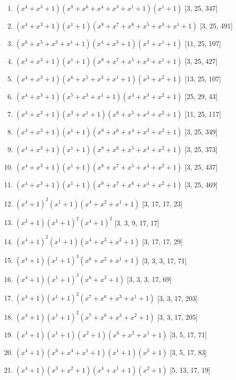\documentclass[10pt,twocolumn]{article}
\begin{document}
\begin{enumerate}
\item $(x^{4} + x^{3} + 1)(x^{8} + x^{6} + x^{4} + x^{3} + x^{1} + 1)(x^{1} + 1)$  [3, 25, 347]
\item $(x^{4} + x^{3} + 1)(x^{1} + 1)(x^{8} + x^{7} + x^{6} + x^{5} + x^{3} + x^{1} + 1)$  [3, 25, 491]
\item $(x^{6} + x^{5} + x^{3} + x^{1} + 1)(x^{4} + x^{3} + 1)(x^{3} + x^{1} + 1)$  [11, 25, 107]
\item $(x^{4} + x^{3} + 1)(x^{1} + 1)(x^{8} + x^{7} + x^{5} + x^{3} + x^{1} + 1)$  [3, 25, 427]
\item $(x^{4} + x^{3} + 1)(x^{6} + x^{5} + x^{3} + x^{1} + 1)(x^{3} + x^{2} + 1)$  [13, 25, 107]
\item $(x^{4} + x^{3} + 1)(x^{5} + x^{3} + x^{1} + 1)(x^{4} + x^{3} + x^{2} + 1)$  [25, 29, 43]
\item $(x^{4} + x^{3} + 1)(x^{3} + x^{1} + 1)(x^{6} + x^{5} + x^{4} + x^{2} + 1)$  [11, 25, 117]
\item $(x^{4} + x^{3} + 1)(x^{1} + 1)(x^{8} + x^{6} + x^{4} + x^{3} + x^{2} + 1)$  [3, 25, 349]
\item $(x^{4} + x^{3} + 1)(x^{1} + 1)(x^{8} + x^{6} + x^{5} + x^{4} + x^{2} + 1)$  [3, 25, 373]
\item $(x^{4} + x^{3} + 1)(x^{1} + 1)(x^{8} + x^{7} + x^{5} + x^{4} + x^{2} + 1)$  [3, 25, 437]
\item $(x^{4} + x^{3} + 1)(x^{1} + 1)(x^{8} + x^{7} + x^{6} + x^{4} + x^{2} + 1)$  [3, 25, 469]
\item $(x^{4} + 1)^{2}(x^{1} + 1)(x^{4} + x^{2} + x^{1} + 1)$  [3, 17, 17, 23]
\item $(x^{3} + 1)(x^{1} + 1)^{2}(x^{4} + 1)^{2}$  [3, 3, 9, 17, 17]
\item $(x^{4} + 1)^{2}(x^{1} + 1)(x^{4} + x^{3} + x^{2} + 1)$  [3, 17, 17, 29]
\item $(x^{4} + 1)(x^{1} + 1)^{3}(x^{6} + x^{2} + x^{1} + 1)$  [3, 3, 3, 17, 71]
\item $(x^{4} + 1)(x^{1} + 1)^{3}(x^{6} + x^{2} + 1)$  [3, 3, 3, 17, 69]
\item $(x^{4} + 1)(x^{1} + 1)^{2}(x^{7} + x^{6} + x^{3} + x^{1} + 1)$  [3, 3, 17, 203]
\item $(x^{4} + 1)(x^{1} + 1)^{2}(x^{7} + x^{6} + x^{3} + x^{2} + 1)$  [3, 3, 17, 205]
\item $(x^{4} + 1)(x^{1} + 1)(x^{2} + 1)(x^{6} + x^{2} + x^{1} + 1)$  [3, 5, 17, 71]
\item $(x^{4} + 1)(x^{6} + x^{4} + x^{1} + 1)(x^{1} + 1)(x^{2} + 1)$  [3, 5, 17, 83]
\item $(x^{4} + 1)(x^{3} + x^{2} + 1)(x^{4} + x^{1} + 1)(x^{2} + 1)$  [5, 13, 17, 19]

\end{enumerate}
\end{document}
